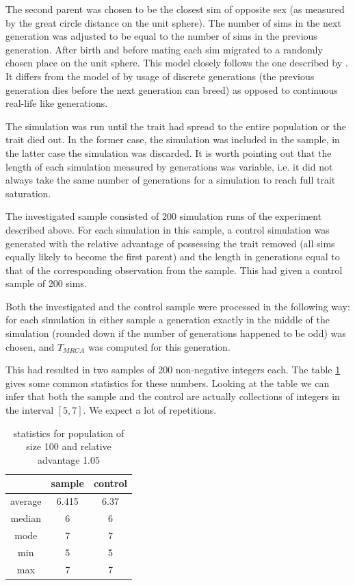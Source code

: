 \documentclass{l4proj}
\begin{document}
The second parent was chosen to be the closest sim of opposite sex (as measured by the great circle distance on the unit sphere). The number of sims in the next generation was adjusted to be equal to the number of sims in the previous generation. After birth and before mating each sim migrated to a randomly chosen place on the unit sphere. This model closely follows the one described by \cite{peng10}. It differs from the model of \cite{rohde04} by usage of discrete generations (the previous generation dies before the next generation can breed) as opposed to continuous real-life like generations.

The simulation was run until the trait had spread to the entire population or the trait died out. In the former case, the simulation was included in the sample, in the latter case the simulation was discarded. It is worth pointing out that the length of each simulation measured by generations was variable, i.e. it did not always take the same number of generations for a simulation to reach full trait saturation.

The investigated sample consisted of 200 simulation runs of the experiment described above. For each simulation in this sample, a control simulation was generated with the relative advantage of possessing the trait removed (all sims equally likely to become the first parent) and the length in generations equal to that of the corresponding observation from the sample. This had given a control sample of 200 sims.

Both the investigated and the control sample were processed in the following way: for each simulation in either sample a generation exactly in the middle of the simulation (rounded down if the number of generations happened to be odd) was chosen, and $T_{MRCA}$ was computed for this generation.

This had resulted in two samples of 200 non-negative integers each. The table \ref{populationTable} gives some common statistics for these numbers. Looking at the table we can infer that both the sample and the control are actually collections of integers in the interval $[5, 7]$. We expect a lot of repetitions.

\begin{table}[]
    \centering
    \begin{tabular}{|c|c|c|}
    \hline
     & sample & control \\ \hline\hline
     average & 6.415 & 6.37 \\ \hline
     median & 6 & 6 \\ \hline
     mode & 7 & 7 \\ \hline
     min & 5 & 5 \\ \hline
     max & 7 & 7 \\ \hline
    \end{tabular}
    \caption{statistics for population of size 100 and relative advantage 1.05}
    \label{populationTable}
\end{table}
\end{document}
